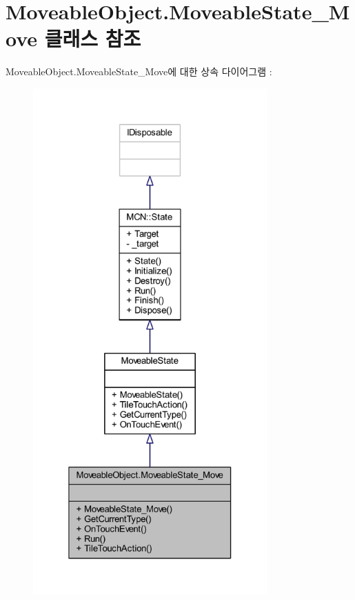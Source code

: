 \hypertarget{class_moveable_object_1_1_moveable_state___move}{}\section{Moveable\+Object.\+Moveable\+State\+\_\+\+Move 클래스 참조}
\label{class_moveable_object_1_1_moveable_state___move}


Moveable\+Object.\+Moveable\+State\+\_\+\+Move에 대한 상속 다이어그램 \+: \nopagebreak
\begin{figure}[H]
\begin{center}
\leavevmode
\includegraphics[height=550pt]{class_moveable_object_1_1_moveable_state___move__inherit__graph}
\end{center}
\end{figure}


